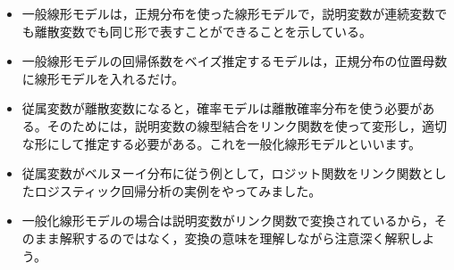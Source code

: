 \begin{itemize}
	\item 一般線形モデルは，正規分布を使った線形モデルで，説明変数が連続変数でも離散変数でも同じ形で表すことができることを示している。
	\item 一般線形モデルの回帰係数をベイズ推定するモデルは，正規分布の位置母数に線形モデルを入れるだけ。
	\item 従属変数が離散変数になると，確率モデルは離散確率分布を使う必要がある。そのためには，説明変数の線型結合をリンク関数を使って変形し，適切な形にして推定する必要がある。これを一般化線形モデルといいます。
	\item 従属変数がベルヌーイ分布に従う例として，ロジット関数をリンク関数としたロジスティック回帰分析の実例をやってみました。
	\item 一般化線形モデルの場合は説明変数がリンク関数で変換されているから，そのまま解釈するのではなく，変換の意味を理解しながら注意深く解釈しよう。
\end{itemize}
